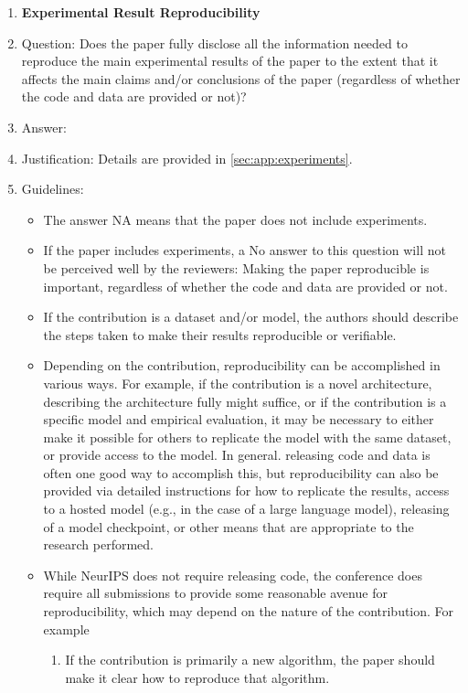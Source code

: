 \documentclass{article}
\theoremstyle{plain}
\theoremstyle{definition}
\theoremstyle{remark}
\theoremstyle{remark}
\begin{document}
\begin{enumerate}
    \item {\bf Experimental Result Reproducibility}
    \item[] Question: Does the paper fully disclose all the information needed to reproduce the main experimental results of the paper to the extent that it affects the main claims and/or conclusions of the paper (regardless of whether the code and data are provided or not)?
    \item[] Answer: \answerYes{} %
    \item[] Justification: Details are provided in \autoref{sec:app:experiments}.
    \item[] Guidelines:
    \begin{itemize}
        \item The answer NA means that the paper does not include experiments.
        \item If the paper includes experiments, a No answer to this question will not be perceived well by the reviewers: Making the paper reproducible is important, regardless of whether the code and data are provided or not.
        \item If the contribution is a dataset and/or model, the authors should describe the steps taken to make their results reproducible or verifiable. 
        \item Depending on the contribution, reproducibility can be accomplished in various ways. For example, if the contribution is a novel architecture, describing the architecture fully might suffice, or if the contribution is a specific model and empirical evaluation, it may be necessary to either make it possible for others to replicate the model with the same dataset, or provide access to the model. In general. releasing code and data is often one good way to accomplish this, but reproducibility can also be provided via detailed instructions for how to replicate the results, access to a hosted model (e.g., in the case of a large language model), releasing of a model checkpoint, or other means that are appropriate to the research performed.
        \item While NeurIPS does not require releasing code, the conference does require all submissions to provide some reasonable avenue for reproducibility, which may depend on the nature of the contribution. For example
        \begin{enumerate}
            \item If the contribution is primarily a new algorithm, the paper should make it clear how to reproduce that algorithm.

\end{enumerate}
\end{itemize}
\end{enumerate}
\end{document}
